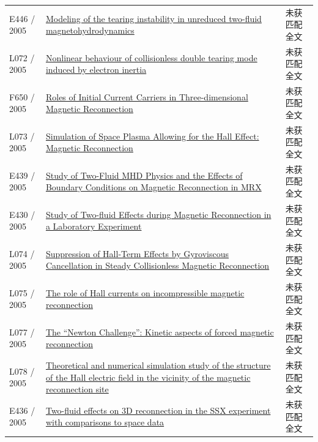 \begin{longtable}{P{24mm}P{97mm}P{27mm}}
E446 / 2005 & \href{https://doi.org/10.1134/1.2031627}{Modeling of the tearing instability in unreduced two-fluid magnetohydrodynamics} & 未获匹配全文\\

L072 / 2005 & \href{https://doi.org/10.1088/0029-5515/45/11/006}{Nonlinear behaviour of collisionless double tearing mode induced by electron inertia} & 未获匹配全文\\

F650 / 2005 & \href{http://lucid.igpp.ucla.edu/lessons/ess265/2005/7th-ISSS/CONTENTS/DATA_PDF/P-1-29.PDF}{Roles of Initial Current Carriers in Three-dimensional Magnetic Reconnection} & 未获匹配全文\\

L073 / 2005 & \href{https://doi.org/10.1007/s10598-005-0026-5}{Simulation of Space Plasma Allowing for the Hall Effect: Magnetic Reconnection} & 未获匹配全文\\

E439 / 2005 & \href{http://absimage.aps.org/image/DPP05/MWS_DPP05-2005-001148.pdf}{Study of Two-Fluid MHD Physics and the Effects of Boundary Conditions on Magnetic Reconnection in MRX} & 未获匹配全文\\

E430 / 2005 & \href{https://ui.adsabs.harvard.edu/abs/2005APS..DPPLP1096Y/abstract}{Study of Two-fluid Effects during Magnetic Reconnection in a Laboratory Experiment} & 未获匹配全文\\

L074 / 2005 & \href{https://doi.org/10.1103/physrevlett.95.045003}{Suppression of Hall-Term Effects by Gyroviscous Cancellation in Steady Collisionless Magnetic Reconnection} & 未获匹配全文\\

L075 / 2005 & \href{https://doi.org/10.1016/j.asr.2005.06.054}{The role of Hall currents on incompressible magnetic reconnection} & 未获匹配全文\\

L077 / 2005 & \href{https://doi.org/10.1029/2005ja011228}{The “Newton Challenge”: Kinetic aspects of forced magnetic reconnection} & 未获匹配全文\\

L078 / 2005 & \href{https://doi.org/10.1017/s0022377805003922}{Theoretical and numerical simulation study of the structure of the Hall electric field in the vicinity of the magnetic reconnection site} & 未获匹配全文\\

E436 / 2005 & \href{http://absimage.aps.org/image/DPP05/MWS_DPP05-2005-000619.pdf}{Two-fluid effects on 3D reconnection in the SSX experiment with comparisons to space data} & 未获匹配全文\\


\end{longtable}
